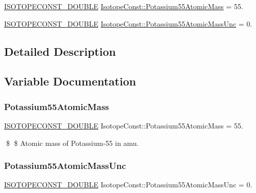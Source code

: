 \begin{DoxyCompactItemize}
\item 
\mbox{\hyperlink{group___isotope_const-_macros_ga8f45a7272ce02c0b4c65c44636ed719a}{I\+S\+O\+T\+O\+P\+E\+C\+O\+N\+S\+T\+\_\+\+D\+O\+U\+B\+LE}} \mbox{\hyperlink{group___isotope_const-_potassium-_k55_ga8e41610d82e3da3ea8be1d35ff880785}{Isotope\+Const\+::\+Potassium55\+Atomic\+Mass}} = 55.
\item 
\mbox{\hyperlink{group___isotope_const-_macros_ga8f45a7272ce02c0b4c65c44636ed719a}{I\+S\+O\+T\+O\+P\+E\+C\+O\+N\+S\+T\+\_\+\+D\+O\+U\+B\+LE}} \mbox{\hyperlink{group___isotope_const-_potassium-_k55_ga99008931bd6f199e7e5bfab65b6ffcae}{Isotope\+Const\+::\+Potassium55\+Atomic\+Mass\+Unc}} = 0.
\end{DoxyCompactItemize}


\subsection{Detailed Description}


\subsection{Variable Documentation}
\mbox{\label{group___isotope_const-_potassium-_k55_ga8e41610d82e3da3ea8be1d35ff880785}} 
\subsubsection{\texorpdfstring{Potassium55\+Atomic\+Mass}{Potassium55AtomicMass}}
{\footnotesize\ttfamily \mbox{\hyperlink{group___isotope_const-_macros_ga8f45a7272ce02c0b4c65c44636ed719a}{I\+S\+O\+T\+O\+P\+E\+C\+O\+N\+S\+T\+\_\+\+D\+O\+U\+B\+LE}} Isotope\+Const\+::\+Potassium55\+Atomic\+Mass = 55.}

\$ \$ Atomic mass of Potassium-\/55 in amu. \mbox{\label{group___isotope_const-_potassium-_k55_ga99008931bd6f199e7e5bfab65b6ffcae}} 
\subsubsection{\texorpdfstring{Potassium55\+Atomic\+Mass\+Unc}{Potassium55AtomicMassUnc}}
{\footnotesize\ttfamily \mbox{\hyperlink{group___isotope_const-_macros_ga8f45a7272ce02c0b4c65c44636ed719a}{I\+S\+O\+T\+O\+P\+E\+C\+O\+N\+S\+T\+\_\+\+D\+O\+U\+B\+LE}} Isotope\+Const\+::\+Potassium55\+Atomic\+Mass\+Unc = 0.}

